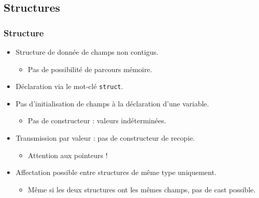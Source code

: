 \subsection{Structures}

\begin{frame}
\frametitle{Structure}
\begin{itemize}[<+->]
\item Structure de donnée de champs non contigus.
	\begin{itemize}
	\item Pas de possibilité de parcours mémoire.
	\end{itemize}
\item Déclaration via le mot-clé \lstinline|struct|.
\item Pas d'initialisation de champs à la déclaration d'une variable.
	\begin{itemize}
	\item Pas de constructeur : valeurs indéterminées.
	\end{itemize}
\item Transmission par valeur : pas de constructeur de recopie.
	\begin{itemize}
	\item Attention aux pointeurs !
	\end{itemize}
\item Affectation possible entre structures de même type uniquement.
	\begin{itemize}
	\item Même si les deux structures ont les mêmes champs, pas de cast possible.
	\end{itemize}
\end{itemize}
\end{frame}

